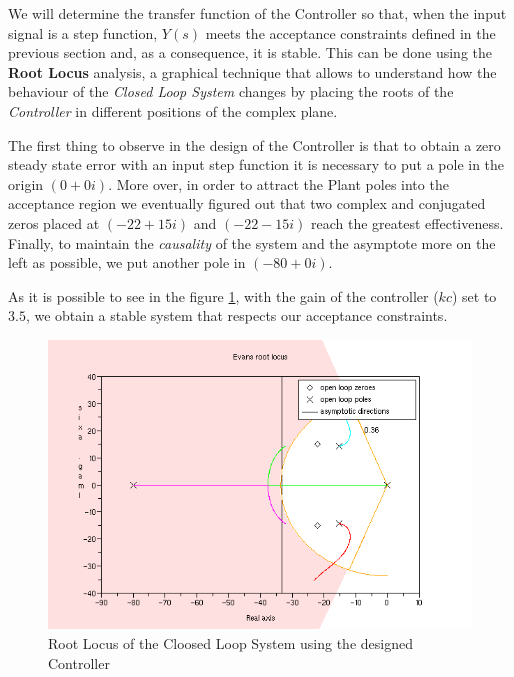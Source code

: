We will determine the transfer function of the Controller so that, when the input signal is a step function, $Y(s)$ meets the acceptance constraints defined in the previous section and, as a consequence, it is stable. This can be done using the \textbf{Root Locus} analysis, a graphical technique that allows to understand how the behaviour of the \emph{Closed Loop System} changes by placing the roots of the \emph{Controller} in different positions of the complex plane.

The first thing to observe in the design of the Controller is that to obtain a zero steady state error with an input step function it is necessary to put a pole in the origin $(0 + 0i)$. More over, in order to attract the Plant poles into the acceptance region we eventually figured out that two complex and conjugated zeros placed at $(-22 + 15i)$ and $(-22 - 15i)$ reach the greatest effectiveness. Finally, to maintain the \textit{causality} of the system and the asymptote more on the left as possible, we put another pole in $(-80 + 0i)$.

As it is possible to see in the figure \ref{fig:RootLocus_CLS}, with the gain of the controller ($kc$) set to $3.5$, we obtain a stable system that respects our acceptance constraints. 

\begin{figure}[H]
  \begin{center}
  \includegraphics[scale=0.5]{FIGURES_2/RootLocusSinglePoleInZero.png}
    \caption[Root Locus]{Root Locus of the Cloosed Loop System using the designed Controller}
    \label{fig:RootLocus_CLS}
  \end{center}
\end{figure}

